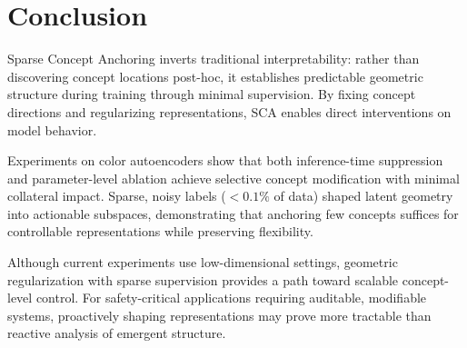 \section{Conclusion}
\label{sec:conclusion}

Sparse Concept Anchoring inverts traditional interpretability: rather than discovering concept locations post-hoc, it establishes predictable geometric structure during training through minimal supervision. By fixing concept directions and regularizing representations, SCA enables direct interventions on model behavior.

Experiments on color autoencoders show that both inference-time suppression and parameter-level ablation achieve selective concept modification with minimal collateral impact. Sparse, noisy labels ($<0.1\%$ of data) shaped latent geometry into actionable subspaces, demonstrating that anchoring few concepts suffices for controllable representations while preserving flexibility.

Although current experiments use low-dimensional settings, geometric regularization with sparse supervision provides a path toward scalable concept-level control. For safety-critical applications requiring auditable, modifiable systems, proactively shaping representations may prove more tractable than reactive analysis of emergent structure.
